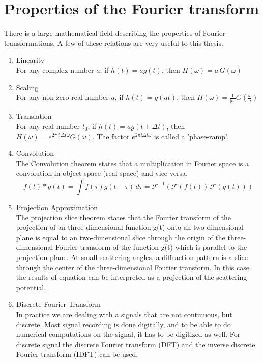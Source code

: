 \section{Properties of the Fourier transform}
There is a large mathematical field describing the properties of Fourier transformations. A few of these relations are very useful to this thesis.
\begin{enumerate}

\item Linearity\\
	For any complex number $a$, if $h(t) = a g(t)$, then $H(\omega) = a \, G(\omega)$

\item Scaling\\
	For any non-zero real number $a$, if $h(t) = g(a t)$, then $H(\omega) = \frac{1}{|a|} G\left(\frac{\omega}{a}\right)$

\item Translation\\
	For any real number $t_0$, if $h(t) = a g(t+\Delta t)$, then $H(\omega) = e^{2\pi\,i\,\Delta t \omega} G(\omega)$. The factor $e^{2 \pi i \Delta t \omega}$ is called a 'phase-ramp'.

\item Convolution\\
The Convolution theorem states that a multiplication in Fourier space is a convolution in object space (real space) and vice versa.
\begin{equation}
f(t) * g(t) = \int f(\tau)g(t-\tau)\,d\tau = \mathcal{F}^{-1} \left( \mathcal{F}(f(t))\,\mathcal{F}(g(t))\right)
\end{equation}

\item {Projection Approximation}\\
The projection slice theorem states that the Fourier transform of the projection of an three-dimensional function g(t) onto an two-dimensional plane is equal to an two-dimensional slice through the origin of the three-dimensional Fourier transform of the function g(t)
which is parallel to the projection plane. At small scattering angles, a diffraction pattern is a slice through the center of the three-dimensional Fourier transform. In this case the results of equation can be interpreted as a projection of the scattering potential. 

\item {Discrete Fourier Transform}\\
In practice we are dealing with a signals that are not continuous, but discrete. Most signal recording is done digitally, and to be able to do numerical computations on the signal, it has to be digitized as well. For discrete signal the discrete Fourier transform (DFT) and the inverse discrete Fourier transform (IDFT) can be used.


\end{enumerate}
